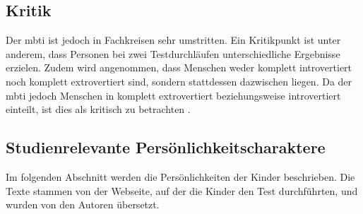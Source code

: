 \noindent
\cite{jung_2014}

\subsection{Kritik}
Der \acrshort{mbti} ist jedoch in Fachkreisen sehr umstritten. Ein Kritikpunkt ist unter anderem, dass Personen bei zwei Testdurchläufen unterschiedliche Ergebnisse erzielen. Zudem wird angenommen, dass Menschen weder komplett introvertiert noch komplett extrovertiert sind, sondern stattdessen dazwischen liegen. Da der \acrshort{mbti} jedoch Menschen in komplett extrovertiert beziehungsweise introvertiert einteilt, ist dies als kritisch zu betrachten \cite{pittengerDavid2005}. 


\subsection{Studienrelevante Persönlichkeitscharaktere}
Im folgenden Abschnitt werden die Persönlichkeiten der Kinder beschrieben. Die Texte stammen von der Webseite, auf der die Kinder den Test durchführten, und wurden von den Autoren übersetzt.

